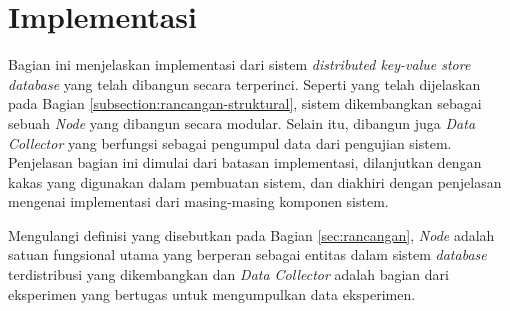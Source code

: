 \section{Implementasi}
\label{sec:implementation}

Bagian ini menjelaskan implementasi dari sistem \textit{distributed key-value store database} yang telah dibangun secara terperinci. Seperti yang telah dijelaskan pada Bagian \ref{subsection:rancangan-struktural}, sistem dikembangkan sebagai sebuah \textit{Node} yang dibangun secara modular. Selain itu, dibangun juga \textit{Data Collector} yang berfungsi sebagai pengumpul data dari pengujian sistem. Penjelasan bagian ini dimulai dari batasan implementasi, dilanjutkan dengan kakas yang digunakan dalam pembuatan sistem, dan diakhiri dengan penjelasan mengenai implementasi dari masing-masing komponen sistem.

Mengulangi definisi yang disebutkan pada Bagian \ref{sec:rancangan}, \textit{Node} adalah satuan fungsional utama yang berperan sebagai entitas dalam sistem \textit{database} terdistribusi yang dikembangkan dan \textit{Data Collector} adalah bagian dari eksperimen yang bertugas untuk mengumpulkan data eksperimen.





